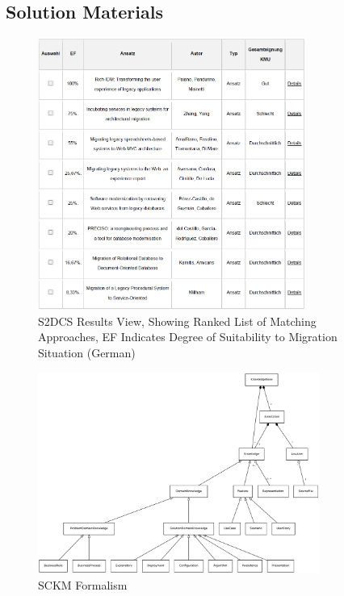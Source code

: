\begin{appendix}
\chapter{Solution Materials}
\begin{figure}[h!]
\hypertarget{fig:s2dcs-results}{%
\centering
\includegraphics[width=0.78\textwidth]{../figures/screenshots/s2dcs-results.PNG}
\caption[S2DCS Results View]{S2DCS Results View, Showing Ranked List of Matching Approaches, EF Indicates Degree of Suitability to Migration Situation (German)}\label{fig:s2dcs-results}
}
\end{figure}

\begin{figure}
\hypertarget{fig:sckm-full}{%
\centering
\includegraphics[width=0.82\textwidth]{../figures/sckm-full-uml.pdf}
\caption{SCKM Formalism}\label{fig:sckm-full}
}
\end{figure}


\end{appendix}
